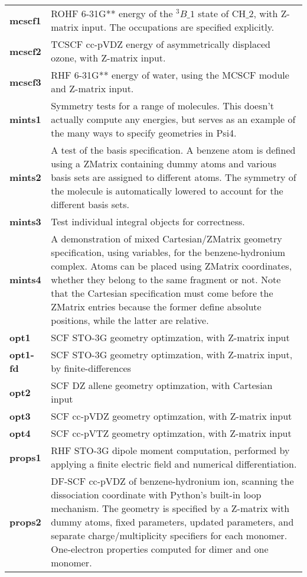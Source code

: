 \begin{tabular*}{\textwidth}[tb]{p{}p{}}
{\bf mcscf1} &  ROHF 6-31G** energy of the $^3B\_1$ state of CH$\_2$, with Z-matrix input. The occupations are specified explicitly.\\
{\bf mcscf2} &  TCSCF cc-pVDZ  energy of asymmetrically displaced ozone, with Z-matrix input.\\
{\bf mcscf3} &  RHF 6-31G** energy of water, using the MCSCF module and Z-matrix input.\\
{\bf mints1} &  Symmetry tests for a range of molecules.  This doesn't actually compute any energies, but serves as an example of the many ways to specify geometries in Psi4.\\
{\bf mints2} &  A test of the basis specification.  A benzene atom is defined using a ZMatrix containing dummy atoms and various basis sets are assigned to different atoms.  The symmetry of the molecule is automatically lowered to account for the different basis sets.\\
{\bf mints3} &  Test individual integral objects for correctness.\\
{\bf mints4} &  A demonstration of mixed Cartesian/ZMatrix geometry specification, using variables, for the benzene-hydronium complex.  Atoms can be placed using ZMatrix coordinates, whether they belong to the same fragment or not.  Note that the Cartesian specification must come before the ZMatrix entries because the former define absolute positions, while the latter are relative.\\
{\bf opt1} &  SCF STO-3G geometry optimzation, with Z-matrix input\\
{\bf opt1-fd} &  SCF STO-3G geometry optimzation, with Z-matrix input, by finite-differences\\
{\bf opt2} &  SCF DZ allene geometry optimzation, with Cartesian input\\
{\bf opt3} &  SCF cc-pVDZ geometry optimzation, with Z-matrix input\\
{\bf opt4} &  SCF cc-pVTZ geometry optimzation, with Z-matrix input\\
{\bf props1} &  RHF STO-3G dipole moment computation, performed by applying a finite electric field and numerical differentiation.\\
{\bf props2} &  DF-SCF cc-pVDZ of benzene-hydronium ion, scanning the dissociation coordinate with Python's built-in loop mechanism. The geometry is specified by a Z-matrix with dummy atoms, fixed parameters, updated parameters, and separate charge/multiplicity specifiers for each monomer. One-electron properties computed for dimer and one monomer.\\

\end{tabular*}
